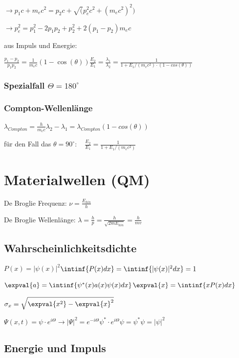 \documentclass[10pt,a4paper]{scrartcl}
\begin{document}
\begin{multicols*}{3}
	$\rightarrow p_1c+m_ec^2=p_2c+\sqrt(p_e^2c^2+(m_ec^2)^2)$
	
	$ \rightarrow p_e^2=p_1^2-2p_1p_2+p_2^2+2(p_1-p_2)m_ec$
	
	aus Impuls und Energie:
	
	$\frac{p_1-p_2}{p_1p_2}=\frac{1}{m_ec}(1-\cos(\theta))$\hfill$\frac{E_2}{E_1}=\frac{\lambda_1}{\lambda_2}=\frac{1}{1+E_1/(m_ec^2)\cdot (1-cos(\theta))}$
	
	\subsubsection{Spezialfall $\Theta=180^\circ$}
	
	
	\subsubsection{Compton-Wellenlänge}
	
	$\lambda_{Compton}=\frac{h}{m_ec}$\hfill$\lambda_2-\lambda_1=\lambda_{Compton}(1-cos(\theta))$
	
	für den Fall das $\theta = 90^{\circ}:\quad\frac{E_2}{E_1}=\frac{1}{1+E_1/(m_ec^2)}$
	
	\section{Materialwellen (QM)}
	
	De Broglie Frequenz: $\nu=\frac{E_{kin}}{h}$
	
	De Broglie Wellenlänge: $\lambda=\frac{h}{p}=\frac{h}{\sqrt{2mE_{kin}}}=\frac{h}{m v}$
	
	\subsection*{Wahrscheinlichkeitsdichte}
	
	$P(x)=|\psi(x)|^2$\hfill$\intinf{P(x)dx}=\intinf{|\psi(x)|^2dx}=1$
	
	$\expval{a}=\intinf{\psi^*(x)a(x)\psi(x)dx}$\hfill$\expval{x}=\intinf{xP(x)dx}$
	
	$\sigma_x=\sqrt{\expval{x^2}-\expval{x}^2}$
	
	$\Psi(x,t)=\psi\cdot e^{i\Theta}\rightarrow |\Psi|^2=e^{-i\Theta}\psi^\ast\cdot e^{i\Theta}\psi=\psi^\ast\psi=|\psi|^2$	
	
	\subsection*{Energie und Impuls}
	

\end{multicols*}
\end{document}
